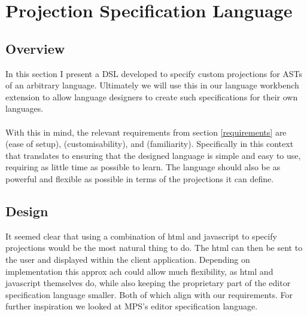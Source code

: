\documentclass{report}
\begin{document}
\section{Projection Specification Language}\label{EditorLanguage}
\subsection{Overview}
In this section I present a DSL developed to specify custom projections for ASTs of an arbitrary language. Ultimately we will use this in our language workbench extension to allow language designers to create such specifications for their own languages.
\\
\\
With this in mind, the relevant requirements from section \ref{requirements} are \RSetup (ease of setup), \RCustom (customisability), and \RFamiliarity (familiarity). Specifically in this context that translates to ensuring that the designed language is simple and easy to use, requiring as little time as possible to learn. The language should also be as powerful and flexible as possible in terms of the projections it can define.

\subsection{Design}

It seemed clear that using a combination of html and javascript to specify projections would be the most natural thing to do. The html can then be sent to the user and displayed within the client application. Depending on implementation this approx	ach could allow much flexibility, as html and javascript themselves do, while also keeping the proprietary part of the editor specification language smaller. Both of which align with our requirements. For further inspiration we looked at MPS's editor specification language.
\end{document}
